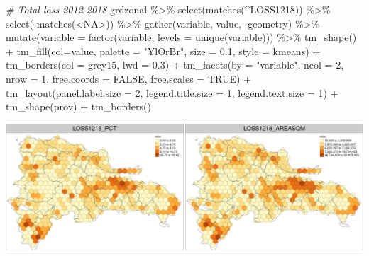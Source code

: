 \documentclass[10pt,landscape,a3paper]{article}
\newenvironment{Shaded}{\begin{snugshade}}{\end{snugshade}}
\newcommand{\AttributeTok}[1]{\textcolor[rgb]{0.77,0.63,0.00}{#1}}
\newcommand{\CommentTok}[1]{\textcolor[rgb]{0.56,0.35,0.01}{\textit{#1}}}
\newcommand{\ConstantTok}[1]{\textcolor[rgb]{0.00,0.00,0.00}{#1}}
\newcommand{\DecValTok}[1]{\textcolor[rgb]{0.00,0.00,0.81}{#1}}
\newcommand{\FloatTok}[1]{\textcolor[rgb]{0.00,0.00,0.81}{#1}}
\newcommand{\FunctionTok}[1]{\textcolor[rgb]{0.00,0.00,0.00}{#1}}
\newcommand{\NormalTok}[1]{#1}
\newcommand{\SpecialCharTok}[1]{\textcolor[rgb]{0.00,0.00,0.00}{#1}}
\newcommand{\StringTok}[1]{\textcolor[rgb]{0.31,0.60,0.02}{#1}}
\begin{document}
\begin{Shaded}
\begin{Highlighting}[]

\CommentTok{\# Total loss 2012{-}2018}
\NormalTok{grdzonal }\SpecialCharTok{\%\textgreater{}\%} \FunctionTok{select}\NormalTok{(}\FunctionTok{matches}\NormalTok{(}\StringTok{\textquotesingle{}\^{}LOSS1218\textquotesingle{}}\NormalTok{)) }\SpecialCharTok{\%\textgreater{}\%} \FunctionTok{select}\NormalTok{(}\SpecialCharTok{{-}}\FunctionTok{matches}\NormalTok{(}\StringTok{\textquotesingle{}\textless{}NA\textgreater{}\textquotesingle{}}\NormalTok{)) }\SpecialCharTok{\%\textgreater{}\%} 
  \FunctionTok{gather}\NormalTok{(variable, value, }\SpecialCharTok{{-}}\NormalTok{geometry) }\SpecialCharTok{\%\textgreater{}\%}
  \FunctionTok{mutate}\NormalTok{(}\AttributeTok{variable =} \FunctionTok{factor}\NormalTok{(variable, }\AttributeTok{levels =} \FunctionTok{unique}\NormalTok{(variable))) }\SpecialCharTok{\%\textgreater{}\%} 
  \FunctionTok{tm\_shape}\NormalTok{() }\SpecialCharTok{+}
    \FunctionTok{tm\_fill}\NormalTok{(}\AttributeTok{col=}\StringTok{\textquotesingle{}value\textquotesingle{}}\NormalTok{, }\AttributeTok{palette =} \StringTok{"YlOrBr"}\NormalTok{, }\AttributeTok{size =} \FloatTok{0.1}\NormalTok{, }\AttributeTok{style =} \StringTok{\textquotesingle{}kmeans\textquotesingle{}}\NormalTok{) }\SpecialCharTok{+}
    \FunctionTok{tm\_borders}\NormalTok{(}\AttributeTok{col =} \StringTok{\textquotesingle{}grey15\textquotesingle{}}\NormalTok{, }\AttributeTok{lwd =} \FloatTok{0.3}\NormalTok{) }\SpecialCharTok{+}
    \FunctionTok{tm\_facets}\NormalTok{(}\AttributeTok{by =} \StringTok{"variable"}\NormalTok{, }\AttributeTok{ncol =} \DecValTok{2}\NormalTok{, }\AttributeTok{nrow =} \DecValTok{1}\NormalTok{, }\AttributeTok{free.coords =} \ConstantTok{FALSE}\NormalTok{, }\AttributeTok{free.scales =} \ConstantTok{TRUE}\NormalTok{) }\SpecialCharTok{+}
    \FunctionTok{tm\_layout}\NormalTok{(}\AttributeTok{panel.label.size =} \DecValTok{2}\NormalTok{, }\AttributeTok{legend.title.size =} \DecValTok{1}\NormalTok{, }\AttributeTok{legend.text.size =} \DecValTok{1}\NormalTok{) }\SpecialCharTok{+}
  \FunctionTok{tm\_shape}\NormalTok{(prov) }\SpecialCharTok{+} \FunctionTok{tm\_borders}\NormalTok{()}
\end{Highlighting}
\end{Shaded}

\begin{center}\includegraphics{img/data-download-preparation-eda/zonal-long-term-grid-10} \end{center}
\end{document}
